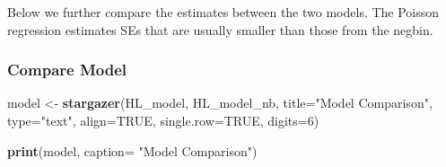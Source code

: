 \documentclass[
]{article}
\newenvironment{Shaded}{\begin{snugshade}}{\end{snugshade}}
\newcommand{\AttributeTok}[1]{\textcolor[rgb]{0.13,0.29,0.53}{#1}}
\newcommand{\ConstantTok}[1]{\textcolor[rgb]{0.56,0.35,0.01}{#1}}
\newcommand{\DecValTok}[1]{\textcolor[rgb]{0.00,0.00,0.81}{#1}}
\newcommand{\FunctionTok}[1]{\textcolor[rgb]{0.13,0.29,0.53}{\textbf{#1}}}
\newcommand{\NormalTok}[1]{#1}
\newcommand{\OtherTok}[1]{\textcolor[rgb]{0.56,0.35,0.01}{#1}}
\newcommand{\StringTok}[1]{\textcolor[rgb]{0.31,0.60,0.02}{#1}}
\begin{document}
Below we further compare the estimates between the two models. The
Poisson regression estimates SEs that are usually smaller than those
from the negbin.

\hypertarget{compare-model}{%
\subsubsection{Compare Model}\label{compare-model}}

\begin{Shaded}
\begin{Highlighting}[]
\NormalTok{model }\OtherTok{\textless{}{-}} \FunctionTok{stargazer}\NormalTok{(HL\_model, HL\_model\_nb, }\AttributeTok{title=}\StringTok{"Model Comparison"}\NormalTok{,}
          \AttributeTok{type=}\StringTok{"text"}\NormalTok{, }\AttributeTok{align=}\ConstantTok{TRUE}\NormalTok{, }\AttributeTok{single.row=}\ConstantTok{TRUE}\NormalTok{, }\AttributeTok{digits=}\DecValTok{6}\NormalTok{)}

\FunctionTok{print}\NormalTok{(model, }\AttributeTok{caption=} \StringTok{"Model Comparison"}\NormalTok{)}
\end{Highlighting}
\end{Shaded}
\end{document}
